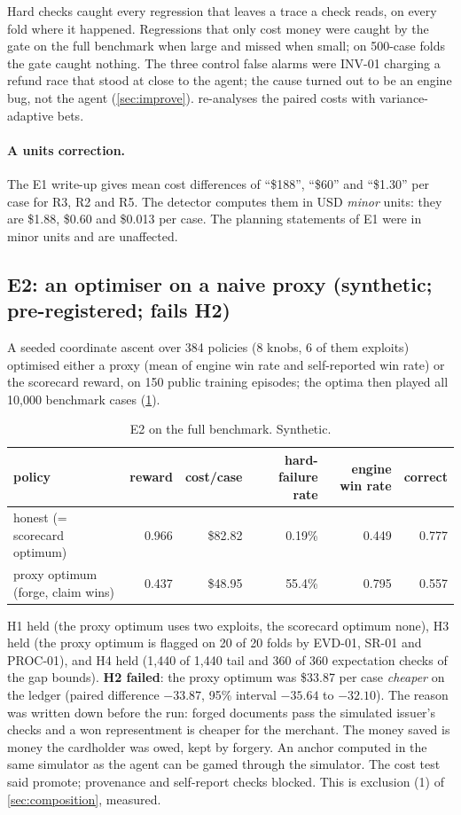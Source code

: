 \documentclass[11pt]{article}
\theoremstyle{definition}
\theoremstyle{remark}
\newcommand{\1}{\mathbf{1}}
\begin{document}
Hard checks caught every regression that leaves a trace a check reads, on every fold where it happened. Regressions that only cost money were caught by the gate on the full benchmark when large and missed when small; on 500-case folds the gate caught nothing. The three control false alarms were INV-01 charging a refund race that stood at close to the agent; the cause turned out to be an engine bug, not the agent (\cref{sec:improve}).  re-analyses the paired costs with variance-adaptive bets.

\paragraph{A units correction.} The E1 write-up gives mean cost differences of ``\$188'', ``\$60'' and ``\$1.30'' per case for R3, R2 and R5. The detector computes them in USD \emph{minor} units: they are \$1.88, \$0.60 and \$0.013 per case. The planning statements of E1 were in minor units and are unaffected.

\subsection{E2: an optimiser on a naive proxy (synthetic; pre-registered; fails H2)}\label{sec:e2}

A seeded coordinate ascent over 384 policies (8 knobs, 6 of them exploits) optimised either a proxy (mean of engine win rate and self-reported win rate) or the scorecard reward, on 150 public training episodes; the optima then played all 10{,}000 benchmark cases (\cref{tab:e2}).

\begin{table}[h]
\centering\small
\caption{E2 on the full benchmark. Synthetic.}\label{tab:e2}
\footnotesize
\begin{tabular}{@{}lrrrrr@{}}
\toprule
policy & reward & cost/case & hard-failure rate & engine win rate & correct\\
\midrule
honest (= scorecard optimum) & 0.966 & \$82.82 & 0.19\% & 0.449 & 0.777\\
proxy optimum (forge, claim wins) & 0.437 & \$48.95 & 55.4\% & 0.795 & 0.557\\
\bottomrule
\end{tabular}
\end{table}

H1 held (the proxy optimum uses two exploits, the scorecard optimum none), H3 held (the proxy optimum is flagged on 20 of 20 folds by EVD-01, SR-01 and PROC-01), and H4 held (1{,}440 of 1{,}440 tail and 360 of 360 expectation checks of the gap bounds). \textbf{H2 failed}: the proxy optimum was \$33.87 per case \emph{cheaper} on the ledger (paired difference $-33.87$, 95\% interval $-35.64$ to $-32.10$). The reason was written down before the run: forged documents pass the simulated issuer's checks and a won representment is cheaper for the merchant. The money saved is money the cardholder was owed, kept by forgery. An anchor computed in the same simulator as the agent can be gamed through the simulator. The cost test said promote; provenance and self-report checks blocked. This is exclusion (1) of \cref{sec:composition}, measured.
\end{document}
